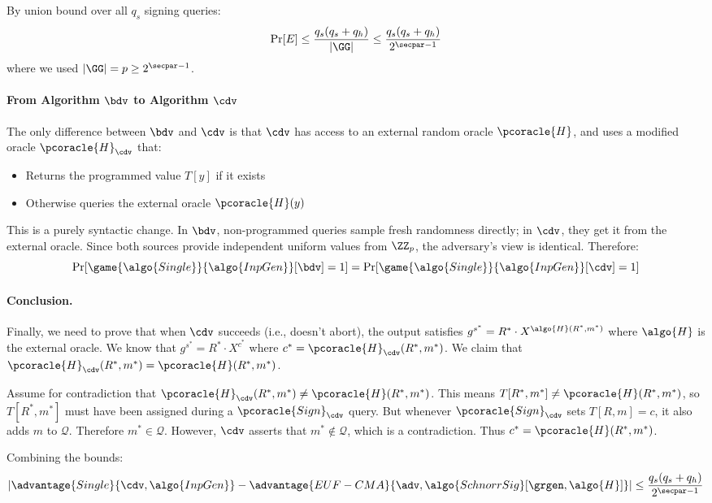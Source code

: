 \begin{mysolution}
  By union bound over all $q_s$ signing queries:
  \[
    \Pr[E] \leq \frac{q_s(q_s + q_h)}{|\GG|} \leq \frac{q_s(q_s + q_h)}{2^{\secpar-1}}
  \]
  where we used $|\GG| = p \geq 2^{\secpar-1}$.

  \paragraph{From Algorithm $\bdv$ to Algorithm $\cdv$}
  The only difference between $\bdv$ and $\cdv$ is that $\cdv$ has access to an external random oracle $\pcoracle{H}$, and uses a modified oracle $\pcoracle{H}_{\cdv}$ that:
  \begin{itemize}
    \item Returns the programmed value $T[y]$ if it exists
    \item Otherwise queries the external oracle $\pcoracle{H}(y)$
  \end{itemize}

  This is a purely syntactic change. In $\bdv$, non-programmed queries sample fresh randomness directly; in $\cdv$, they get it from the external oracle.
  Since both sources provide independent uniform values from $\ZZ_p$, the adversary's view is identical. Therefore:
  \[
    \Pr[\game{\algo{Single}}{\algo{InpGen}}[\bdv] = 1] = \Pr[\game{\algo{Single}}{\algo{InpGen}}[\cdv] = 1]
  \]

  \paragraph{Conclusion.}
  Finally, we need to prove that when $\cdv$ succeeds (i.e., doesn't abort), the output satisfies $g^{s^*} = R^* \cdot X^{\algo{H}(R^*, m^*)}$ where $\algo{H}$ is the external oracle. We know that $g^{s^*} = R^* \cdot X^{c^*}$ where $c^* = \pcoracle{H}_{\cdv}(R^*, m^*)$. We claim that $\pcoracle{H}_{\cdv}(R^*, m^*) = \pcoracle{H}(R^*, m^*)$.
  
  Assume for contradiction that $\pcoracle{H}_{\cdv}(R^*, m^*) \neq \pcoracle{H}(R^*, m^*)$. This means $T[R^*, m^*] \neq \pcoracle{H}(R^*, m^*)$, so $T[R^*, m^*]$ must have been assigned during a $\pcoracle{Sign}_{\cdv}$ query. But whenever $\pcoracle{Sign}_{\cdv}$ sets $T[R, m] = c$, it also adds $m$ to $\mathcal{Q}$. Therefore $m^* \in \mathcal{Q}$. However, $\cdv$ asserts that $m^* \notin \mathcal{Q}$, which is a contradiction. Thus $c^* = \pcoracle{H}(R^*, m^*)$.
  
  Combining the bounds:
  \[
    \left|\advantage{Single}{\cdv, \algo{InpGen}} - \advantage{EUF-CMA}{\adv, \algo{SchnorrSig}[\grgen, \algo{H}]}\right| \leq \frac{q_s(q_s + q_h)}{2^{\secpar-1}}
  \]

\end{mysolution}
\fi

